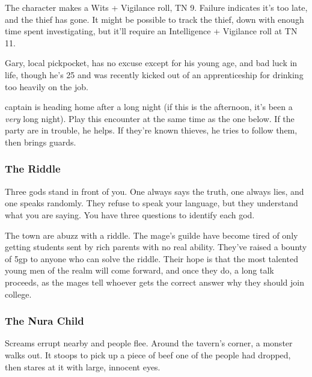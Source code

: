 The character makes a Wits + Vigilance roll, TN 9.  Failure indicates it's too late, and the thief has gone.  It might be possible to track the thief, down with enough time spent investigating, but it'll require an Intelligence + Vigilance roll at TN 11.

Gary, local pickpocket, has no excuse except for his young age, and bad luck in life, though he's 25 and was recently kicked out of an apprenticeship for drinking too heavily on the job.

\humanthief


\Gls{captain} is heading home after a long night (if this is the afternoon, it's been a \emph{very} long night).  Play this encounter at the same time as the one below.  If the party are in trouble, he helps.  If they're known thieves, he tries to follow them, then brings guards.



\subsubsection{The Riddle}

\begin{boxtext}
Three gods stand in front of you.  One always says the truth, one always lies, and one speaks randomly.  They refuse to speak your language, but they understand what you are saying.  You have three questions to identify each god.
\end{boxtext}

The town are abuzz with a riddle.  The mage's guilde have become tired of only getting students sent by rich parents with no real ability.  They've raised a bounty of 5gp to anyone who can solve the riddle.  Their hope is that the most talented young men of the realm will come forward, and once they do, a long talk proceeds, as the mages tell whoever gets the correct answer why they should join \gls{college}.

\subsubsection{The Nura Child}

\begin{boxtext}
	Screams errupt nearby and people flee.  Around the tavern's corner, a monster walks out.  It stoops to pick up a piece of beef one of the people had dropped, then stares at it with large, innocent eyes.
\end{boxtext}

